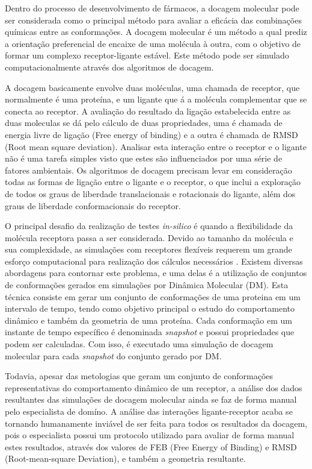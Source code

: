 Dentro do processo de desenvolvimento de fármacos, a docagem molecular pode ser considerada como o principal método para avaliar a eficácia das combinações químicas entre as conformações. A docagem molecular é um método a qual prediz a orientação preferencial de encaixe de uma molécula à outra, com o objetivo de formar um complexo receptor-ligante estável. Este método pode ser simulado computacionalmente através dos algoritmos de docagem. 

A docagem basicamente envolve duas moléculas, uma chamada de receptor, que normalmente é uma proteína, e um ligante que á a molécula complementar que se conecta ao receptor. A avaliação do resultado da ligação estabelecida entre as duas moleculas se dá pelo cálculo de duas propriedades, uma é chamada de energia livre de ligação (Free energy of binding) e a outra é chamada de RMSD (Root mean square deviation). Analisar esta interação entre o receptor e o ligante não é uma tarefa simples visto que estes são influenciados por uma série de fatores ambientais. Os algoritmos de docagem precisam levar em consideração todas as formas de ligação entre o ligante e o receptor, o que inclui a exploração de todos os graus de liberdade translacionais e rotacionais do ligante, além dos graus de liberdade conformacionais do receptor.

O principal desafio da realização de testes \emph{in-silico} é quando a flexibilidade da molécula receptora passa a ser considerada. Devido ao tamanho da molécula e sua complexidade, as simulações com receptores flexíveis requerem um grande esforço computacional para realização dos cálculos necessários \cite{art08}.
Existem diversas abordagens para contornar este problema, e uma delas é a utilização de conjuntos de conformações gerados em simulações por Dinâmica Molecular (DM). Esta técnica consiste em gerar um conjunto de conformações de uma proteina em um intervalo de tempo, tendo como objetivo principal o estudo do comportamento dinâmico e também da geometria de uma proteína. Cada conformação em um instante de tempo específico é denominada \emph{snapshot} e possui propriedades que podem ser calculadas. Com isso, é executado uma simulação de docagem molecular para cada \emph{snapshot} do conjunto gerado por DM.

Todavia, apesar das metologias que geram um conjunto de conformações representativas do comportamento dinâmico de um receptor, a análise dos dados resultantes das simulações de docagem molecular ainda se faz de forma manual pelo especialista de domíno. A análise das interações ligante-receptor acaba se tornando humanamente inviável de ser feita para todos os resultados da docagem, pois o especialista possui um protocolo utilizado para avaliar de forma manual estes resultados, através dos valores de FEB (Free Energy of Binding) e RMSD (Root-mean-square Deviation), e também a geometria resultante.

